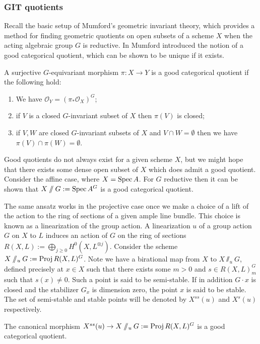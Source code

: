 \subsubsection{GIT quotients}
Recall the basic setup of Mumford's geometric invariant theory, which provides a method for finding geometric quotients on open subsets of a scheme \(X\) when the acting algebraic group \(G\) is reductive.
%
%
%
In \cite{mumford1994} Mumford introduced the notion of a good categorical quotient, which can be shown to be unique if it exists.
%
%
%
\begin{definition}
A surjective \(G\)-equivariant morphism \(\pi : X \to Y\) is a good categorical quotient if the following hold:
\begin{enumerate}
\item We have \(\mathcal{O}_Y = (\pi_* \mathcal{O}_X)^G\);
\item if \(V\) is a closed \(G\)-invariant subset of \(X\) then \(\pi(V)\) is closed;
\item if \(V,W\) are closed \(G\)-invariant subsets of \(X\) and \(V \cap W = \emptyset\) then we have \(\pi(V) \cap \pi(W) = \emptyset\).
\end{enumerate}
\end{definition}
%
%
%
Good quotients do not always exist for a given scheme \(X\), but we might hope that there exists some dense open subset of \(X\) which does admit a good quotient. Consider the affine case, where \(X = \operatorname{Spec} A\). For \(G\) reductive then it can be shown that \(X \sslash G : = \operatorname{Spec} A^G\) is a good categorical quotient.

The same ansatz works in the projective case once we make a choice of a lift of the action to the ring of sections of a given ample line bundle. This choice is known as a linearization of the group action.
%
%
%
%
%
%
A linearization \(u\) of a group action \(G\) on \(X\) to \(L\) induces an action of \(G\) on the ring of sections \(R(X,L) := \bigoplus_{j \ge 0} H^0(X,L^{\otimes j}) \). Consider the scheme \(X \sslash_u G := \operatorname{Proj} R(X,L)^G\). Note we have a birational map from \(X\) to \(X \sslash_u G\), defined precisely at \(x \in X\) such that there exists some \(m> 0 \) and \(s \in R(X,L)^G_m\) such that \(s(x) \neq 0\). Such a point is said to be semi-stable. If in addition \(G \cdot x\) is closed and the stabilizer \(G_x\) is dimension zero, the point \(x\) is said to be stable. The set of semi-stable and stable points will be denoted by \(X^{ss}(u)\) and \(X^{s}(u)\) respectively.
%
%
%
\begin{construction}
The canonical morphism \(X^{ss}(u) \to X\sslash_u G := \operatorname{Proj} R(X,L)^G \) is a good categorical quotient.
\end{construction}
